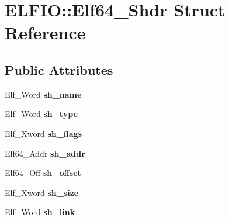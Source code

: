 \hypertarget{struct_e_l_f_i_o_1_1_elf64___shdr}{}\section{E\+L\+F\+IO\+:\+:Elf64\+\_\+\+Shdr Struct Reference}
\label{struct_e_l_f_i_o_1_1_elf64___shdr}
\subsection*{Public Attributes}
\begin{DoxyCompactItemize}
\item 
Elf\+\_\+\+Word {\bfseries sh\+\_\+name}\hypertarget{struct_e_l_f_i_o_1_1_elf64___shdr_ae8611cdc0457a12cc98eae4788f3bca8}{}\label{struct_e_l_f_i_o_1_1_elf64___shdr_ae8611cdc0457a12cc98eae4788f3bca8}

\item 
Elf\+\_\+\+Word {\bfseries sh\+\_\+type}\hypertarget{struct_e_l_f_i_o_1_1_elf64___shdr_ad6234c6c95c5d6ffc80ae36d14dce93d}{}\label{struct_e_l_f_i_o_1_1_elf64___shdr_ad6234c6c95c5d6ffc80ae36d14dce93d}

\item 
Elf\+\_\+\+Xword {\bfseries sh\+\_\+flags}\hypertarget{struct_e_l_f_i_o_1_1_elf64___shdr_ae86c23cee39dc5f61a9eaedb4155e48d}{}\label{struct_e_l_f_i_o_1_1_elf64___shdr_ae86c23cee39dc5f61a9eaedb4155e48d}

\item 
Elf64\+\_\+\+Addr {\bfseries sh\+\_\+addr}\hypertarget{struct_e_l_f_i_o_1_1_elf64___shdr_a1083fafca12acbd7d630ab5cd3a57543}{}\label{struct_e_l_f_i_o_1_1_elf64___shdr_a1083fafca12acbd7d630ab5cd3a57543}

\item 
Elf64\+\_\+\+Off {\bfseries sh\+\_\+offset}\hypertarget{struct_e_l_f_i_o_1_1_elf64___shdr_a031a7961883be9ef214bf187afdf36e8}{}\label{struct_e_l_f_i_o_1_1_elf64___shdr_a031a7961883be9ef214bf187afdf36e8}

\item 
Elf\+\_\+\+Xword {\bfseries sh\+\_\+size}\hypertarget{struct_e_l_f_i_o_1_1_elf64___shdr_abcdf4db455342d0c49ee8cebfda502cd}{}\label{struct_e_l_f_i_o_1_1_elf64___shdr_abcdf4db455342d0c49ee8cebfda502cd}

\item 
Elf\+\_\+\+Word {\bfseries sh\+\_\+link}\hypertarget{struct_e_l_f_i_o_1_1_elf64___shdr_a43748a31b2bd69c61a2e1e143ebe96db}{}\label{struct_e_l_f_i_o_1_1_elf64___shdr_a43748a31b2bd69c61a2e1e143ebe96db}


\end{DoxyCompactItemize}
